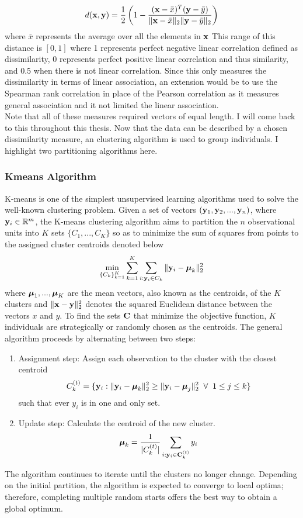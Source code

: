 $$d(\mathbf x,\mathbf y) = \frac{1}{2}\left(1 - \frac{(\mathbf x - \bar{x})^{T}(\mathbf y - \bar{y})}{\|\mathbf x - \bar{x}\|_{2}\|\mathbf y - \bar{y}\|_{2}}\right)$$
where $\bar{x}$ represents the average over all the elements in $\mathbf x$ This range of this distance is $[0,1]$ where 1 represents perfect negative linear correlation defined as dissimilarity, 0 represents perfect positive linear correlation and thus similarity, and 0.5 when there is not linear correlation. Since this only measures the dissimilarity in terms of linear association, an extension would be to use the Spearman rank correlation in place of the Pearson correlation as it measures general association and it not limited the linear association.\\

Note that all of these measures required vectors of equal length. I will come back to this throughout this thesis. Now that the data can be described by a chosen dissimilarity measure, an clustering algorithm is used to group individuals. I highlight two partitioning algorithms here.
\subsubsection{Kmeans Algorithm}
K-means \cite{macqueen1967} is one of the simplest unsupervised learning algorithms used to solve the well-known clustering problem. Given a set of vectors $(\mathbf y_{1},\mathbf y_{2},...,\mathbf y_{n})$, where $\mathbf y_{i}\in\mathbb{R}^{m}$, the K-means clustering algorithm aims to partition the $n$ observational units into $K$ sets $\{C_{1},...,C_{K}\}$ so as to minimize the sum of squares from points to the assigned cluster centroids denoted below
$$\min_{\{C_{k}\}_{k=1}^{K}}\sum_{k=1}^{K}\sum_{i: \mathbf y_{i}\in C_{k}}\|\mathbf y_{i} -\boldsymbol \mu_{k}\|_{2}^{2}$$
where $\boldsymbol\mu_{1},...,\boldsymbol\mu_{K}$ are the mean vectors, also known as the centroids, of the $K$ clusters and $\|\mathbf x-\mathbf y\|_{2}^{2}$ denotes the squared Euclidean distance between the vectors $x$ and $y$. To find the sets $\mathbf C$ that minimize the objective function, $K$ individuals are  strategically or randomly chosen as the centroids. The general algorithm proceeds by alternating between two steps:
\begin{enumerate}
\item Assignment step: Assign each observation to the cluster with the closest centroid
$$ C_{k}^{(t)} = \{\mathbf y_{i}: \|\mathbf y_{i} - \boldsymbol\mu_{k}\|_{2}^{2}\geq \|\mathbf y_{i} - \boldsymbol\mu_{j}\|_{2}^{2} \;\;\forall\;\; 1\leq j\leq k\}$$
such that ever $y_{i}$ is in one and only set.
\item Update step: Calculate the centroid of the new cluster.
$$\boldsymbol\mu_{k} = \frac{1}{|C_{k}^{(t)}|}\sum_{i: \mathbf y_{i}\in\mathbf C_{k}^{(t)}} y_{i}$$
\end{enumerate}
The algorithm continues to iterate until the clusters no longer change. Depending on the initial partition, the algorithm is expected to converge to local optima; therefore, completing multiple random starts offers the best way to obtain a global optimum. \\

